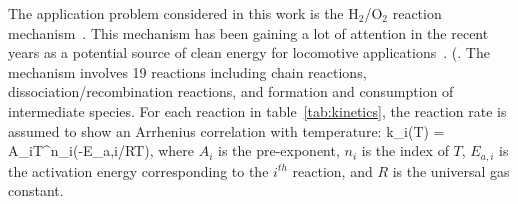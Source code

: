 The application problem considered in this work is the
H$_2$/O$_2$ reaction mechanism~\cite{Yetter:1991}. This mechanism has been
gaining a lot of attention in the recent years as a potential source of clean
energy for locomotive applications~\cite{Das:1996}. (.   
The mechanism involves 19
reactions including chain reactions, dissociation/recombination reactions, and
formation and consumption of intermediate species. For each reaction in
table~\ref{tab:kinetics}, the reaction rate is assumed to show an Arrhenius
correlation with temperature:
%
\be
k_i(T) = A_iT^{n_i}\exp(-E_{a,i}/RT), 
\label{eq:rate}
\ee
%
where $A_i$ is the pre-exponent, $n_i$ is the index of $T$, $E_{a,i}$ is the
activation energy corresponding to the $i^{th}$ reaction, and $R$ is the
universal gas constant.  

